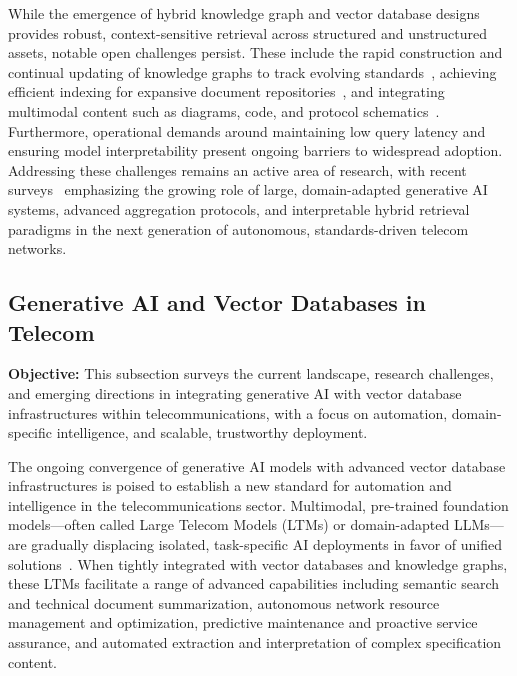 \documentclass[sigconf]{acmart}
\begin{document}
While the emergence of hybrid knowledge graph and vector database designs provides robust, context-sensitive retrieval across structured and unstructured assets, notable open challenges persist. These include the rapid construction and continual updating of knowledge graphs to track evolving standards~\cite{ref20}, achieving efficient indexing for expansive document repositories~\cite{ref16,ref26}, and integrating multimodal content such as diagrams, code, and protocol schematics~\cite{ref21,ref26}. Furthermore, operational demands around maintaining low query latency and ensuring model interpretability present ongoing barriers to widespread adoption. Addressing these challenges remains an active area of research, with recent surveys~\cite{ref26} emphasizing the growing role of large, domain-adapted generative AI systems, advanced aggregation protocols, and interpretable hybrid retrieval paradigms in the next generation of autonomous, standards-driven telecom networks.

\subsection{Generative AI and Vector Databases in Telecom}

\textbf{Objective:} This subsection surveys the current landscape, research challenges, and emerging directions in integrating generative AI with vector database infrastructures within telecommunications, with a focus on automation, domain-specific intelligence, and scalable, trustworthy deployment.

The ongoing convergence of generative AI models with advanced vector database infrastructures is poised to establish a new standard for automation and intelligence in the telecommunications sector. Multimodal, pre-trained foundation models---often called Large Telecom Models (LTMs) or domain-adapted LLMs---are gradually displacing isolated, task-specific AI deployments in favor of unified solutions~\cite{ref51,ref511}. When tightly integrated with vector databases and knowledge graphs, these LTMs facilitate a range of advanced capabilities including semantic search and technical document summarization, autonomous network resource management and optimization, predictive maintenance and proactive service assurance, and automated extraction and interpretation of complex specification content.
\end{document}
